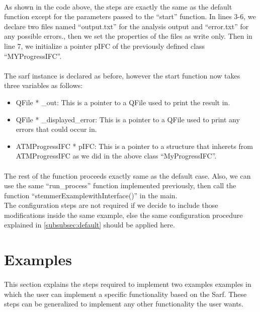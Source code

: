 \documentclass{article}
\begin{document}
\paragraph{}
As shown in the code above, the steps are exactly the same as the default function except for the parameters passed to the ``start'' function. In lines 3-6, we declare two files named ``output.txt'' for the analysis output and ``error.txt'' for any possible errors., then we set the properties of the files as write only. Then in line 7, we initialize a pointer pIFC of the previously defined class ``MYProgressIFC''.

\paragraph{}
The sarf instance is declared as before, however the start function now takes three variables as follows:
\begin{itemize}
\item QFile * \_out: This is a pointer to a QFile used to print the result in.
\item QFile * \_displayed\_error: This is a pointer to a QFile used to print any errors that could occur in.
\item ATMProgressIFC * pIFC: This is a pointer to a structure that inherets from ATMProgressIFC as we did in the above class ``MyProgressIFC''.
\end{itemize}

\paragraph{}
The rest of the function proceeds exactly same as the default case. Also, we can use the same ``run\_process'' function implemented previously, then call the function ``stemmerExamplewithInterface()'' in the main.\\
The configuration steps are not required if we decide to include those modifications inside the same example, else the same configuration procedure explained in \ref{subsubsec:default} should be applied here.

\section{Examples}
\label{sec:examples}
\paragraph{}
This section explains the steps required to implement two examples examples in which the user can implement a specific functionality based on the Sarf. These steps can be generalized to implement any other functionality the user wants.
\end{document}
